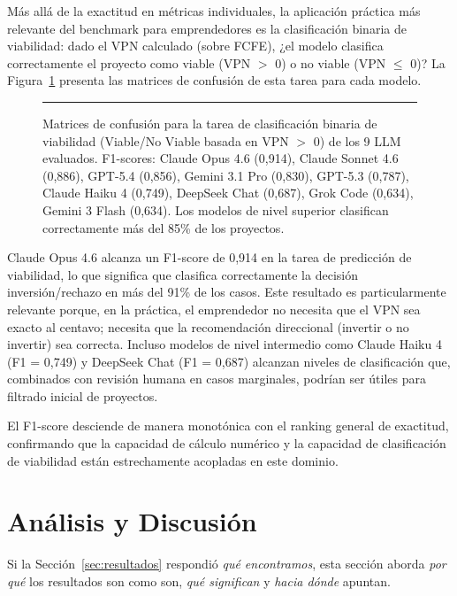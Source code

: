 \documentclass[12pt,a4paper]{article}
\begin{document}
Más allá de la exactitud en métricas individuales, la aplicación práctica más relevante del benchmark para emprendedores es la clasificación binaria de viabilidad: dado el VPN calculado (sobre FCFE), ¿el modelo clasifica correctamente el proyecto como viable (VPN $>$ 0) o no viable (VPN $\leq$ 0)? La Figura~\ref{fig:viabilidad} presenta las matrices de confusión de esta tarea para cada modelo.

\begin{figure}[ht]
\centering
\rule{0.9\linewidth}{6cm}
\caption{Matrices de confusión para la tarea de clasificación binaria de viabilidad (Viable/No Viable basada en VPN $>$ 0) de los 9 LLM evaluados. F1-scores: Claude Opus 4.6 (0,914), Claude Sonnet 4.6 (0,886), GPT-5.4 (0,856), Gemini 3.1 Pro (0,830), GPT-5.3 (0,787), Claude Haiku 4 (0,749), DeepSeek Chat (0,687), Grok Code (0,634), Gemini 3 Flash (0,634). Los modelos de nivel superior clasifican correctamente más del 85\% de los proyectos.}
\label{fig:viabilidad}
\end{figure}

Claude Opus 4.6 alcanza un F1-score de 0,914 en la tarea de predicción de viabilidad, lo que significa que clasifica correctamente la decisión inversión/rechazo en más del 91\% de los casos. Este resultado es particularmente relevante porque, en la práctica, el emprendedor no necesita que el VPN sea exacto al centavo; necesita que la recomendación direccional (invertir o no invertir) sea correcta. Incluso modelos de nivel intermedio como Claude Haiku 4 (F1 = 0,749) y DeepSeek Chat (F1 = 0,687) alcanzan niveles de clasificación que, combinados con revisión humana en casos marginales, podrían ser útiles para filtrado inicial de proyectos.

El F1-score desciende de manera monotónica con el ranking general de exactitud, confirmando que la capacidad de cálculo numérico y la capacidad de clasificación de viabilidad están estrechamente acopladas en este dominio.

\section{Análisis y Discusión}\label{sec:discusion}

Si la Sección~\ref{sec:resultados} respondió \textit{qué encontramos}, esta sección aborda \textit{por qué} los resultados son como son, \textit{qué significan} y \textit{hacia dónde} apuntan.
\end{document}
